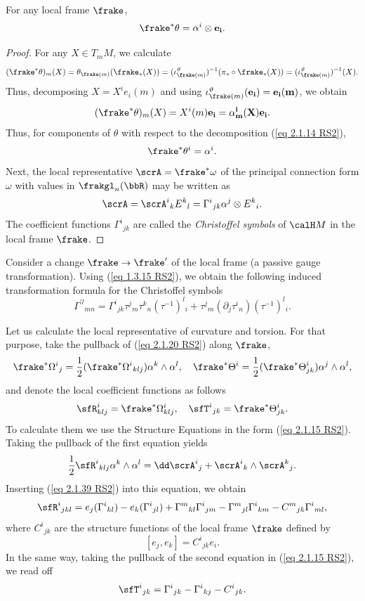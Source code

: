 \begin{lem}[{{\cite[Lem.~2.1.26]{RS2}}}]\label{lem 2.1.26 RS2}
    For any local frame $\frake$,
    \[\frake^\ast \theta=\alpha^i\otimes\bf{e}_i.\]
\end{lem}
\begin{proof}
    For any $X\in T_mM$, we calculate 
    \[(\frake^\ast \theta)_m(X)=\theta_{\frake(m)}(\frake_\ast(X))=(\iota^\vartheta_{\frake(m)})^{-1}(\pi_\ast\circ\frake_\ast(X))=(\iota^\vartheta_{\frake(m)})^{-1}(X).\]
    Thus, decomposing $X=X^ie_i(m)$ and using $\iota^\vartheta_{\frake(m)}(\bf{e}_i)=e_i(m)$, we obtain
    \[(\frake^\ast\theta)_m(X)=X^i(m)\bf{e}_i=\alpha^i_m(X)\bf{e}_i.\]
    Thus, for components of $\theta$ with respect to the decomposition (\ref{eq 2.1.14 RS2}),
    \[\frake^\ast \theta^i=\alpha^i.\]
    Next, the local representative $\scrA=\frake^\ast\omega$ of the principal connection form $\omega$ with values in $\frakgl_n(\bbR)$ may be written as 
    \[\scrA=\scrA^i{}_k E^k{}_l=\Gamma^i{}_{jk}\alpha^j\otimes E^k{}_i.\label{eq 2.1.39 RS2}\]
    The coefficient functions $\Gamma^i{}_{jk}$ are called the \emph{Christoffel symbols} of $\calH M$ in the local frame $\frake$.
\end{proof}

\begin{rem}
    Consider a change $\frake\to \frake'$ of the local frame (a passive gauge transformation). Using (\ref{eq 1.3.15 RS2}), we obtain the following induced transformation formula for the Christoffel symbols 
    \[\Gamma^{\prime l}{}_{mn}=\Gamma^i{}_{jk}\tau^j{}_m \tau^k{}_n(\tau^{-1})^l{}_i+\tau^j{}_m(\partial_j \tau^i{}_n)(\tau^{-1})^l{}_i.\label{eq 2.1.40 RS2}\]
\end{rem}

Let us calculate the local representative of curvature and torsion. For that purpose, take the pullback of (\ref{eq 2.1.20 RS2}) along $\frake$,
\[\frake^\ast \Omega^i{}_j=\frac12(\frake^\ast\Omega^i{}_{klj})\alpha^k\wedge\alpha^l,\quad \frake^\ast\Theta^i=\frac12(\frake^\ast\Theta^i_{jk})\alpha^j\wedge\alpha^l,\]
and denote the local coefficient functions as follows 
\[\sfR^i_{klj}=\frake^\ast\Omega^i_{klj},\quad \sfT^i{}_{jk}=\frake^\ast\Theta^i_{jk}.\]
To calculate them we use the Structure Equations in the form (\ref{eq 2.1.15 RS2}). Taking the pullback of the first equation yields 
\[\frac12\sfR^i{}_{klj}\alpha^k\wedge\alpha^l=\dd\scrA^i{}_j+\scrA^i{}_k\wedge \scrA^k{}_j.\]
Inserting (\ref{eq 2.1.39 RS2}) into this equation, we obtain 
\[\sfR^i{}_{jkl}=e_j(\Gamma^i{}_{kl})-e_k(\Gamma^i{}_{jl})+\Gamma^m{}_{kl}\Gamma^i{}_{jm}-\Gamma^m{}_{jl}\Gamma^i{}_{km}-C^m{}_{jk}\Gamma^i{}_{ml},\label{eq 2.1.42 RS2}\]
where $C^i{}_{jk}$ are the structure functions of the local frame $\frake$ defined by 
\[[e_j,e_k]=C^i{}_{jk}e_i.\]
In the same way, taking the pullback of the second equation in (\ref{eq 2.1.15 RS2}), we read off 
\[\sfT^i{}_{jk}=\Gamma^i{}_{jk}-\Gamma^i{}_{kj}-C^i{}_{jk}.\label{eq 2.1.44 RS2}\]

